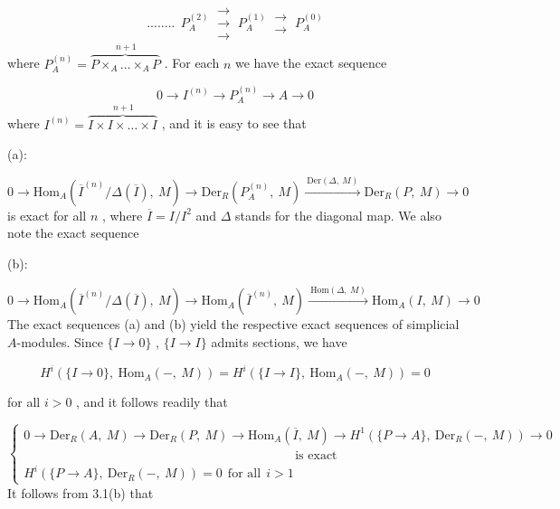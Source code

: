\begin{equation}\tag{*}
........\ \ P_A^{(2)} \ \mathrel{\substack{\to\\ \to\\ \to}} \ P_A^{(1)} \ \mathrel{\substack{\to\\ \to}} \ P_A^{(0)}
\end{equation}
where  $P_A^{(n)} = \overbrace{P\times_A \ldots \times_A P}^{\,n+1}$  . For each  $n$  we have the exact sequence

\begin{equation*}
0 \to I^{(n)} \to P_A^{(n)} \to A \to 0
\end{equation*}
where  $I^{(n)} = \overbrace{I\times I\times \ldots \times I}^{\,n+1}$  , and it is easy to see that

(a):

\begin{equation*}
0 \to \mathrm{Hom}_A(\overline{I}^{(n)}/\Delta(\overline{I}),\ M) \to \mathrm{Der}_R(P_A^{(n)},\ M) \xrightarrow{\ \mathrm{Der}(\Delta,\ M)\ } \mathrm{Der}_R(P,\ M) \to 0
\end{equation*}
is exact for all  $n$  , where  $\overline{I} = I/I^2$  and  $\Delta$  stands for the diagonal map. We also note the exact sequence

(b):

\begin{equation*}
0 \to \mathrm{Hom}_A(\overline{I}^{(n)}/\Delta(\overline{I}),\ M) \to \mathrm{Hom}_A(\overline{I}^{(n)},\ M) \xrightarrow{\ \mathrm{Hom}(\Delta,\ M)\ } \mathrm{Hom}_A(I,\ M) \to 0
\end{equation*}
The exact sequences (a) and (b) yield the respective exact sequences of simplicial $A$-modules. Since  $\{I \to 0\}$ , $\{I \to I\}$  admits sections, we have

\begin{equation*}
H^i(\{I \to 0\},\ \mathrm{Hom}_A(-,\ M)) = H^i(\{I \to I\},\ \mathrm{Hom}_A(-,\ M)) = 0 
\end{equation*}


 for all  $i > 0$  , and it follows readily that

\begin{equation*}
\left\{\begin{array}{l}
0 \to \mathrm{Der}_R(A,\ M) \to \mathrm{Der}_R(P,\ M) \to \mathrm{Hom}_A(\overline{I},\ M) \to H^1(\{P \to A\},\ \mathrm{Der}_R(-,\ M)) \to 0 \\[4pt]
\hspace{9cm}\text{is exact} \\[4pt]
H^i(\{P \to A\},\ \mathrm{Der}_R(-,\ M)) = 0 \ \ \text{for all} \ \ i > 1
\end{array}\right.
\end{equation*}
It follows from 3.1(b) that

